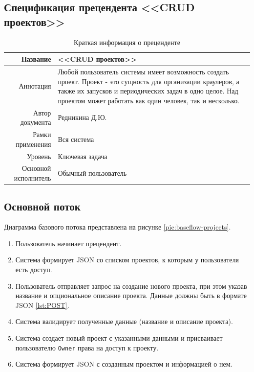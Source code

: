 \documentclass[a4paper,12pt]{article}
\begin{document}
\clearpage
	
	\subsection*{Спецификация прецендента <<CRUD проектов>>}
	
	\begin{longtable}[]{|@{\textbf}r|p{7cm}|} 
    \caption{Краткая информация о преценденте}
    \hline
    Название             & <<CRUD проектов>>   \\ \hline
    Аннотация            & Любой пользователь системы имеет возможность создать проект. Проект - это сущность для организации краулеров, а также их запусков и периодических задач в одно целое. Над проектом может работать как один человек, так и несколько. \\ \hline
    Автор документа      & Редникина Д.Ю.     \\ \hline
    Рамки применения     & Вся система     \\ \hline
    Уровень              & Ключевая задача                     \\ \hline
    Основной исполнитель & Обычный пользователь     \\ \hline
\end{longtable}

\subsection*{Основной поток}

Диаграмма базового потока представлена на рисунке \ref{pic:baseflow-projects}.

\begin{enumerate}
    \def\labelenumi{\arabic{enumi}.}
    \item Пользователь начинает прецендент.
    \item Система формирует JSON со списком проектов, к которым у пользователя есть доступ. \label{g:start}
    \item Пользователь отправляет запрос на создание нового проекта, при этом указав название и опциональное описание проекта. Данные должны быть в формате JSON \ref{lst:POST}. \label{g:create}
    \item Система валидирует полученные данные (название и описание проекта).
    \item Система создает новый проект с указанными данными и присваивает пользователю \texttt{Owner} права на доступ к проекту.
    \item Система формирует JSON с созданным проектом и информацией о нем.
    \label{g:end}
\end{enumerate}
\end{document}
